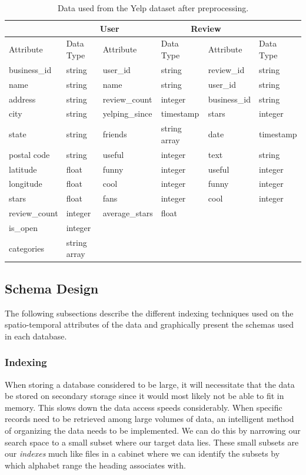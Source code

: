\begin{table}[h!]
\centering
\begin{tabular}{ |p{2cm}|p{2cm}||p{2cm}|p{2cm}||p{2cm}|p{2cm}|}
 \hline
 \rowcolor{Gray}
 \multicolumn{2}{|c||}{Business} & \multicolumn{2}{|c||}{User} & \multicolumn{2}{|c|}{Review} \\
 \hline
 \rowcolor{LightGray}
 Attribute & Data Type & Attribute & Data Type & Attribute & Data Type\\
 \hline
 business\_id & string & user\_id & string & review\_id & string \\
 name & string & name & string  & user\_id & string\\
 address & string & review\_count & integer & business\_id & string\\
 city & string & yelping\_since & timestamp & stars & integer \\
 state & string & friends & string array & date & timestamp\\
 postal code & string & useful & integer & text & string \\
 latitude & float & funny & integer & useful & integer \\
 longitude & float & cool & integer & funny & integer \\
 stars & float & fans & integer & cool & integer \\
 review\_count & integer & average\_stars & float & & \\
 is\_open & integer & & & & \\
 categories & string array & & & &\\
 \hline
\end{tabular}
\vspace*{5mm}
\caption{Data used from the Yelp dataset after preprocessing.}
\label{tab:yelp-data}
\end{table}

\subsection{Schema Design}

The following subsections describe the different indexing techniques used on the spatio-temporal attributes of the data and graphically present the schemas used in each database.

\subsubsection{Indexing}
When storing a database considered to be large, it will necessitate that the data be stored on secondary storage since it would most likely not be able to fit in memory. This slows down the data access speeds considerably. When specific records need to be retrieved among large volumes of data, an intelligent method of organizing the data needs to be implemented. We can do this by narrowing our search space to a small subset where our target data lies. These small subsets are our \emph{indexes} much like files in a cabinet where we can identify the subsets by which alphabet range the heading associates with.

